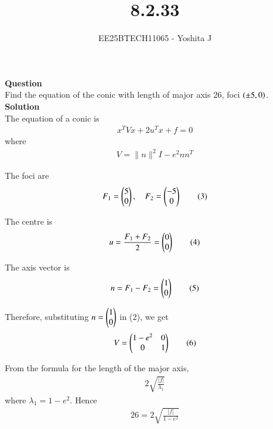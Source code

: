 \documentclass[journal]{IEEEtran}
\begin{document}

\vspace{3cm}

\title{8.2.33}
\author{EE25BTECH11065 - Yoshita J}

{\let\newpage\relax\maketitle}

\renewcommand{\thefigure}{\theenumi}
\renewcommand{\thetable}{\theenumi}
\setlength{\intextsep}{10pt}

\textbf{Question}\\
Find the equation of the conic with length of major axis $26$, foci $\left(\pm 5,0\right)$.\\

\textbf{Solution}\\
The equation of a conic is
\begin{align}
x^T V x + 2u^T x + f = 0 \tag{1}
\end{align}
where
\begin{align}
V = \|n\|^2 I - e^2nn^T \tag{2}
\end{align}

The foci are
\begin{align}
F_1 = \begin{pmatrix}5\\0\end{pmatrix},\quad F_2 = \begin{pmatrix}-5\\0\end{pmatrix} \tag{3}
\end{align}

The centre is
\begin{align}
u = \frac{F_1+F_2}{2} = \begin{pmatrix}0\\0\end{pmatrix} \tag{4}
\end{align}

The axis vector is
\begin{align}
n = F_1-F_2 = \begin{pmatrix}1\\0\end{pmatrix} \tag{5}
\end{align}

Therefore, substituting $n=\begin{pmatrix}1\\0\end{pmatrix}$ in (2), we get
\begin{align}
V = \begin{pmatrix}1-e^2 & 0 \\ 0 & 1\end{pmatrix} \tag{6}
\end{align}

From the formula for the length of the major axis,
\begin{align}
2\sqrt{\frac{|f|}{\lambda_1}} \tag{7}
\end{align}
where $\lambda_1 = 1-e^2$. Hence
\begin{align}
26 = 2\sqrt{\frac{|f|}{1-e^2}} \tag{8}
\end{align}
\end{document}
